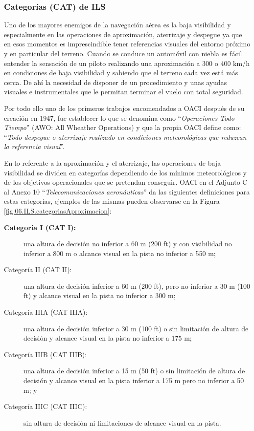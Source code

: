 \subsubsection{Categorías (CAT) de ILS}
\label{sec:06.ILS.categorias}

Uno de los mayores enemigos de la navegación aérea es la baja visibilidad y especialmente en las operaciones
de aproximación, aterrizaje y despegue ya que en esos momentos es imprescindible tener referencias
visuales del entorno próximo y en particular del terreno. Cuando se conduce un automóvil con
niebla es fácil entender la sensación de un piloto realizando una aproximación a 300 o 400 km/h en
condiciones de baja visibilidad y sabiendo que el terreno cada vez está más cerca. De ahí la necesidad
de disponer de un procedimiento y unas ayudas visuales e instrumentales que le permitan terminar
el vuelo con total seguridad.

Por todo ello uno de los primeros trabajos encomendados a OACI después de su creación en
1947, fue establecer lo que se denomina como ``\emph{Operaciones Todo Tiempo}'' (AWO: All Wheather
Operations) y que la propia OACI define como: ``\emph{Todo despegue o aterrizaje realizado en condiciones
  meteorológicas que reduzcan la referencia visual}''.

\begin{tcolorbox}[title = {Categorías de aproximación de precisión de OACI}]  
En lo referente a la aproximación y el aterrizaje, las operaciones de baja visibilidad se dividen
en categorías dependiendo de los mínimos meteorológicos y de los objetivos operacionales que se
pretendan conseguir. OACI en el Adjunto C al Anexo 10 ``\emph{Telecomunicaciones aeronáuticas}'' da las
siguientes definiciones para estas categorías, ejemplos de las mismas pueden observarse en
la Figura \ref{fig:06.ILS.categoriasAproximacion}:

  \begin{description}
  \item  [\bf Categoría I (CAT I):] una altura de decisión no inferior a
    60 m (200 ft) y con visibilidad no inferior a 800 m o alcance
    visual en la pista no inferior a 550 m; 
  \item [Categoría II (CAT II):]
    una altura de decisión inferior a 60 m (200 ft), pero no inferior
    a 30 m (100 ft) y alcance visual en la pista no inferior a 300 m;
    
  \item [Categoría IIIA (CAT IIIA):] una altura de decisión inferior a 30
    m (100 ft) o sin limitación de altura de decisión y alcance visual
    en la pista no inferior a 175 m; 
  \item [Categoría IIIB (CAT IIIB):] una
    altura de decisión inferior a 15 m (50 ft) o sin limitación de
    altura de decisión y alcance visual en la pista inferior a 175 m
    pero no inferior a 50 m; y 
  \item [Categoría IIIC (CAT IIIC):] sin
    altura de decisión ni limitaciones de alcance visual en la pista.
  \end{description}
  
\end{tcolorbox}


